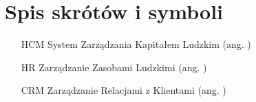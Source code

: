 \chapter{Spis skrótów i symboli}

\begin{itemize}
\item[HCM] System Zarządzania Kapitałem Ludzkim (ang. )
\item[HR] Zarządzanie Zasobami Ludzkimi (ang. )
\item[CRM] Zarządzanie Relacjami z Klientami (ang. )
\end{itemize}
